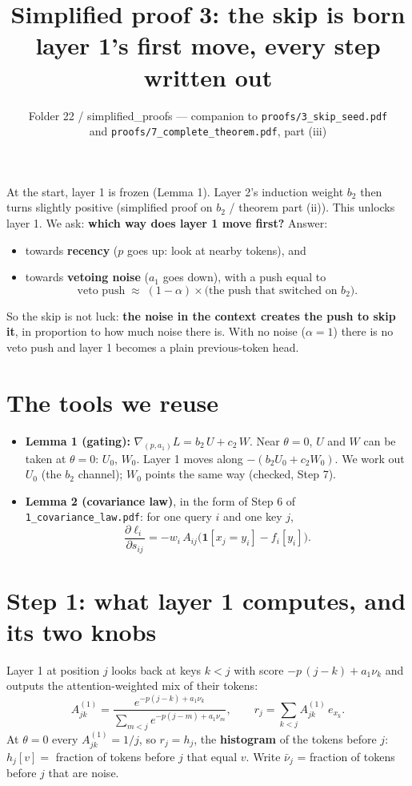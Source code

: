 \documentclass[11pt]{article}
\title{Simplified proof 3: the skip is born\\[4pt]\large layer 1's first move, every step written out}
\author{Folder 22 / simplified\_proofs --- companion to \texttt{proofs/3\_skip\_seed.pdf}\\ and \texttt{proofs/7\_complete\_theorem.pdf}, part (iii)}
\date{}
\newcommand{\1}{\mathbf{1}}
\begin{document}
\maketitle

\begin{idea}
At the start, layer 1 is frozen (Lemma 1). Layer 2's induction weight $b_2$ then turns slightly positive
(simplified proof on $b_2$ / theorem part (ii)). This unlocks layer 1. We ask: \textbf{which way does layer 1
move first?} Answer:
\begin{itemize}
\item towards \textbf{recency} ($p$ goes up: look at nearby tokens), and
\item towards \textbf{vetoing noise} ($a_1$ goes down), with a push equal to
\[
\text{veto push}\;\approx\;(1-\alpha)\times\text{(the push that switched on } b_2).
\]
\end{itemize}
So the skip is not luck: \textbf{the noise in the context creates the push to skip it}, in proportion to how
much noise there is. With no noise ($\alpha=1$) there is no veto push and layer 1 becomes a plain
previous-token head.
\end{idea}

\section*{The tools we reuse}
\begin{itemize}
\item \textbf{Lemma 1 (gating):} $\nabla_{(p,a_1)}L=b_2\,U+c_2\,W$. Near $\theta=0$, $U$ and $W$ can be taken at
$\theta=0$: $U_0$, $W_0$. Layer 1 moves along $-(b_2U_0+c_2W_0)$. We work out $U_0$ (the $b_2$ channel); $W_0$
points the same way (checked, Step 7).
\item \textbf{Lemma 2 (covariance law)}, in the form of Step 6 of \texttt{1\_covariance\_law.pdf}: for one query $i$
and one key $j$,
\[
\frac{\partial\ell_i}{\partial s_{ij}}=-w_i\,A_{ij}\big(\1[x_j=y_i]-f_i[y_i]\big).
\]
\end{itemize}

\section{Step 1: what layer 1 computes, and its two knobs}
Layer 1 at position $j$ looks back at keys $k<j$ with score $-p\,(j-k)+a_1\nu_k$ and outputs the attention-weighted
mix of their tokens:
\[
A^{(1)}_{jk}=\frac{e^{-p(j-k)+a_1\nu_k}}{\sum_{m<j}e^{-p(j-m)+a_1\nu_m}},\qquad r_j=\sum_{k<j}A^{(1)}_{jk}\,e_{x_k}.
\]
At $\theta=0$ every $A^{(1)}_{jk}=1/j$, so $r_j=h_j$, the \textbf{histogram} of the tokens before $j$:
$h_j[v]=$ fraction of tokens before $j$ that equal $v$. Write $\bar\nu_j$ = fraction of tokens before $j$ that are noise.
\end{document}

